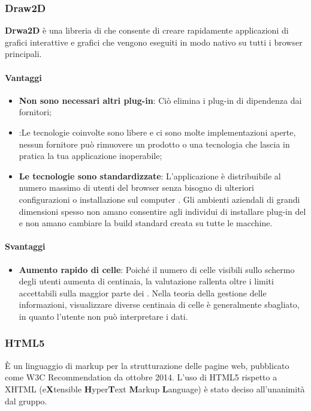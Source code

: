 	\subsubsection{Draw2D}
	\textbf{Drwa2D} è una libreria  di  che consente di creare rapidamente applicazioni di grafici interattive e grafici che vengono eseguiti in modo nativo su tutti i browser principali.

\paragraph{Vantaggi}
\begin{itemize}
\item \textbf{Non sono necessari altri plug-in}: Ciò elimina i plug-in di dipendenza dai fornitori;
\item \textbf{}:Le tecnologie coinvolte sono libere e ci sono molte implementazioni aperte, nessun fornitore può rimuovere un prodotto o una tecnologia che lascia in pratica la tua applicazione inoperabile;
\item \textbf{Le tecnologie sono standardizzate}: L'applicazione è distribuibile al numero massimo di utenti del browser senza bisogno di ulteriori configurazioni o installazione sul computer . Gli ambienti aziendali di grandi dimensioni spesso non amano consentire agli individui di installare plug-in del  e non amano cambiare la build standard creata su tutte le macchine.
\end{itemize}

\paragraph{Svantaggi}
\begin{itemize}
\item \textbf{Aumento rapido di celle}: Poiché il numero di celle visibili sullo schermo degli utenti aumenta di centinaia, la valutazione rallenta oltre i limiti accettabili sulla maggior parte dei . Nella teoria della gestione delle informazioni, visualizzare diverse centinaia di celle è generalmente sbagliato, in quanto l'utente non può interpretare i dati.
\end{itemize}

\subsubsection{HTML5}
È un linguaggio di markup per la strutturazione delle pagine web, pubblicato come W3C Recommendation da ottobre 2014. L’uso di HTML5 rispetto a XHTML
(e\textbf{X}tensible \textbf{H}yper\textbf{T}ext \textbf{M}arkup \textbf{L}anguage) è stato deciso all'unanimità dal gruppo.

